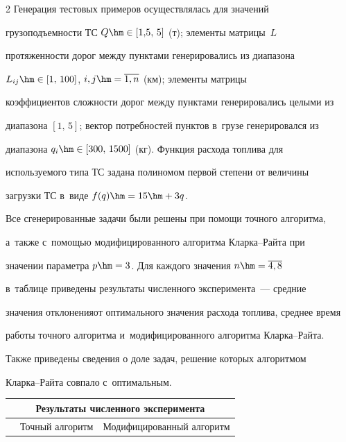 \begin{multicols}{2}
  Генерация тестовых примеров осуществлялась для значений


грузоподъемности ТС $Q\hm\in [1{,}5,\,5]$ (т); элементы матрицы~$L$


протяженности дорог между пунктами генерировались из диапазона


$L_{ij}\hm\in [1,\,100]$, $i,j\hm=\overline{1,n}$ (км); элементы матрицы


коэффициентов сложности дорог между пунктами генерировались целыми из


диапазона $[1,\,5]$; вектор потребностей пунктов в~грузе генерировался из


диапазона $q_i\hm\in [300,\,1500]$ (кг). Функция расхода топлива для


используемого типа ТС задана полиномом первой степени от величины


загрузки ТС в~виде $f(q)\hm=15\hm+3q$.





  Все сгенерированные задачи были решены при помощи точного алгоритма,


а~также с~помощью модифицированного алгоритма Клар\-ка--Рай\-та при


значении параметра $p\hm=3$. Для каждого значения $n\hm= \overline{4,8}$


в~таблице приведены результаты численного эксперимента~--- средние


значения отклонения\linebreak от оптимального значения расхода топлива, среднее время


работы точного алгоритма и~модифицированного алгоритма Клар\-ка--Рай\-та.


Также приведены сведения о доле задач, решение которых алгорит\-мом


  Клар\-ка--Рай\-та совпало с~оптимальным.





\begin{table}\small


\begin{center}


\begin{tabular}{|c|c|c|c|c|}


\multicolumn{5}{c}{Результаты численного эксперимента}\\[6pt]


\hline


&Точный алгоритм&\multicolumn{3}{c|}{Модифицированный алгоритм


}
\end{tabular}
\end{center}
\end{table}
\end{multicols}
